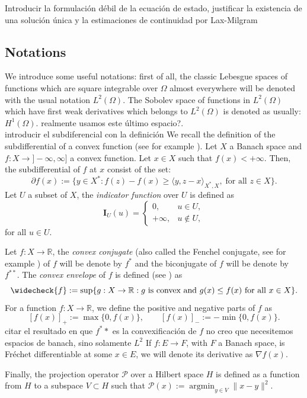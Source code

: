 \documentclass[11pt,a4paper]{amsart}
\newcommand{\om}{\Omega}
\newcommand{\reals}{\mathbb{R}}
\DeclareMathOperator{\argmin}{argmin}
\newcommand{\norm}[1]{\lVert #1 \rVert}
\begin{document}
{\color{red} Introducir la formulación débil de la ecuación de estado, justificar la existencia de una solución única y la estimaciones de continuidad por Lax-Milgram}



\subsection{Notations}
We introduce some useful notations: first of all, the classic Lebesgue spaces of functions which are square integrable over $\om$ almost everywhere will be denoted with the usual notation $L^2(\Omega)$. The Sobolev space of functions in $L^2(\om)$ which have first weak derivatives which belongs to $L^2(\om)$ is denoted as usually: $H^1(\om)$.{\color{red} realmente usamos este último espacio?}.\\

{\color{red} introducir  el subdiferencial con la definición} We recall the definition of the subdifferential of a convex function (see for example \cite{combettes, rock, valkonen}). Let $X$ a Banach space and $f:X\to ]-\infty,\infty]$ a convex function. Let $x\in X$ such that $f(x)<+\infty$. Then, the subdifferential of $f$ at $x$ consist of the set:
\[
\partial f(x):=\{y\in X^*: f(z)-f(x)\ge \langle y,z-x\rangle_{X^*,X},\; \mbox{for all }z\in X\}.
\]
Let $U$ a subset of $X$, the \emph{indicator function} over $U$ is defined as
\[
\mathbf{I}_{U}(u)=\begin{cases}
    0,& u\in U,\\
    +\infty,&u\notin U,
\end{cases}
\]
for all $u\in U$. 

Let $f:X\to \mathbb{R}$, the \emph{convex conjugate} (also called the Fenchel conjugate, see for example \cite{rock}) of $f$ will be denote by $f^*$ and the biconjugate of $f$ will be denote by $f^{**}$. The \emph{convex envelope} of $f$ is defined (see \cite{combettes}) as
\[
\widecheck{f}:=\sup\{g:X\to \reals: g\mbox{ is convex and }g(x)\le f(x) \mbox{ for all }x\in X\}.
\]
For a function $f:X\to \mathbb{R}$, we define the positive and negative parts of $f$ as
\[
[f(x)]_{+}:=\max\{0,f(x)\},\qquad [f(x)]_{-}:=-\min\{0,f(x)\}.
\]
{\color{red} citar el resultado en que $f^**$ es la convexificación de $f$}
{\color{red} no creo que necesitemos espacios de banach, sino solamente $L^2$}
If $f:E\to F$, with $F$ a Banach space, is Fréchet differentiable at some $x\in E$, we will denote its derivative as $\nabla f(x)$. 

Finally, the projection operator $\mathcal{P}$ over a Hilbert space $H$ is defined as a function from $H$ to a subspace $V\subset H$ such that $\mathcal{P}(x):=\argmin_{y\in V}\norm{x-y}^2$.
\end{document}
